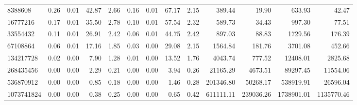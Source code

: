 \begin{tabular}{lrrrrrrrrrrrr}
8388608 & 0.26 & 0.01 & 42.87 & 2.66 & 0.16 & 0.01 & 67.17 & 2.15 & 389.44 & 19.90 & 633.93 & 42.47 \\
16777216 & 0.17 & 0.01 & 35.50 & 2.78 & 0.10 & 0.01 & 57.54 & 2.32 & 589.73 & 34.43 & 997.30 & 77.51 \\
33554432 & 0.11 & 0.01 & 26.91 & 2.42 & 0.06 & 0.01 & 44.75 & 2.42 & 897.03 & 88.83 & 1729.56 & 176.39 \\
67108864 & 0.06 & 0.01 & 17.16 & 1.85 & 0.03 & 0.00 & 29.08 & 2.15 & 1564.84 & 181.76 & 3701.08 & 452.66 \\
134217728 & 0.02 & 0.00 & 7.90 & 1.28 & 0.01 & 0.00 & 13.52 & 1.76 & 4043.74 & 777.52 & 12408.01 & 2825.68 \\
268435456 & 0.00 & 0.00 & 2.29 & 0.21 & 0.00 & 0.00 & 3.94 & 0.26 & 21165.29 & 4673.51 & 89297.45 & 11554.06 \\
536870912 & 0.00 & 0.00 & 0.85 & 0.18 & 0.00 & 0.00 & 1.46 & 0.28 & 201346.80 & 50268.17 & 538919.91 & 26596.04 \\
1073741824 & 0.00 & 0.00 & 0.38 & 0.25 & 0.00 & 0.00 & 0.65 & 0.42 & 611111.11 & 239036.26 & 1738901.01 & 1135770.46 \\
\bottomrule
\end{tabular}
